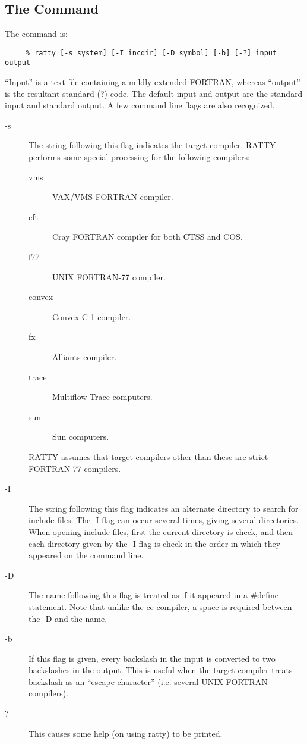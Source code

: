 \documentclass{report}
\begin{document}
\subsection{The Command}
The command is:
\begin{verbatim}
     % ratty [-s system] [-I incdir] [-D symbol] [-b] [-?] input output
\end{verbatim}
``Input'' is a text file containing a mildly extended FORTRAN, whereas
``output'' is the resultant standard (?) code. The default input and
output are the standard input and standard output. A few command line
flags are also recognized.
\begin{description}
\item[-s] The string following this flag indicates the target compiler.
RATTY performs some special processing for the following
compilers:
\begin{description}
\item[vms] VAX/VMS FORTRAN compiler.
\item[cft] Cray FORTRAN compiler for both CTSS and COS.
\item[f77] UNIX FORTRAN-77 compiler.
\item[convex] Convex C-1 compiler.
\item[fx] Alliants compiler.
\item[trace] Multiflow Trace computers.
\item[sun] Sun computers.
\end{description}
RATTY assumes that target compilers other than these are strict FORTRAN-77
compilers.
\item[-I] The string following this flag indicates an alternate directory to
search for include files. The -I flag can occur several times, giving several
directories. When opening include files, first the current directory is
check, and then each directory given by the -I flag is check in the order
in which they appeared on the command line.
\item[-D] The name following this flag is treated as if it appeared in a
\#define statement. Note that unlike the cc compiler, a space is required
between the -D and the name.
\item[-b] If this flag is given, every backslash in the input is converted to
two backslashes in the output. This is useful when the target compiler
treats backslash as an ``escape character'' (i.e. several UNIX FORTRAN
compilers).
\item[?] This causes some help (on using ratty) to be printed.
\end{description}
\end{document}
